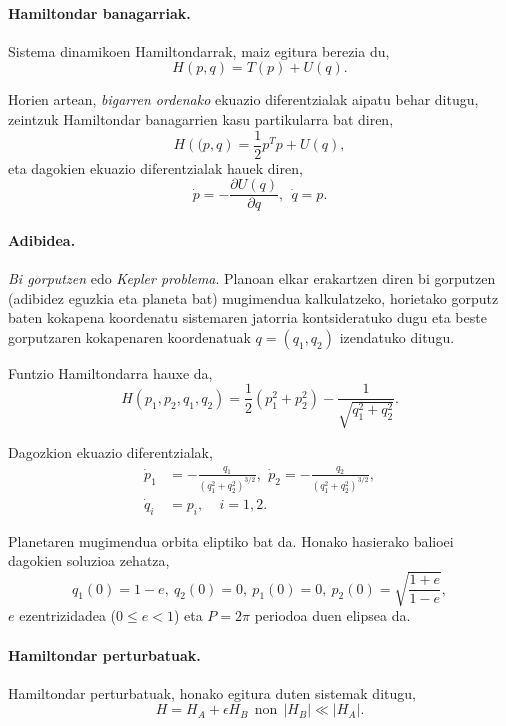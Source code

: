 \paragraph*{Hamiltondar banagarriak.} Sistema dinamikoen Hamiltondarrak, maiz egitura berezia du,
\begin{equation*}
H({p},{q})=T(p)+U({q}).
\end{equation*} 

Horien artean, \emph{bigarren ordenako} ekuazio diferentzialak aipatu behar ditugu, zeintzuk Hamiltondar banagarrien kasu partikularra bat diren,  
\begin{equation*}
H(\mathbf(p,q)=\frac{1}{2}p^Tp +U(q),
\end{equation*}
eta dagokien ekuazio diferentzialak hauek diren,
\begin{equation}
\label{eq:biorden}
\dot{p}=-\frac{\partial U(q)}{\partial q}, \ \ \dot{q}=p. 
\end{equation}

\paragraph*{Adibidea.}
\emph{Bi gorputzen} edo \emph{Kepler problema}. Planoan elkar erakartzen diren bi gorputzen (adibidez eguzkia eta planeta bat) mugimendua kalkulatzeko, horietako gorputz baten kokapena koordenatu sistemaren jatorria kontsideratuko dugu eta beste gorputzaren kokapenaren koordenatuak $q=(q_1,q_2)$ izendatuko ditugu. 

Funtzio Hamiltondarra hauxe da,
\begin{equation*}
H(p_1,p_2,q_1,q_2)=\frac{1}{2}(p_1^2+p_2^2)-\frac{1}{\sqrt{q_1^2+q_2^2}}.
\end{equation*}

Dagozkion ekuazio diferentzialak,
\begin{align*}
\dot{p}_1 &= -\frac{q_1}{(q_1^2+q_2^2)^{3/2}}, \ \, \dot{p}_2= -\frac{q_2}{(q_1^2+q_2^2)^{3/2}}, \\
\dot{q}_i &=p_i, \ \ \ \ \ i=1,2.
\end{align*}

Planetaren mugimendua orbita eliptiko bat da. Honako hasierako balioei dagokien soluzioa zehatza,
\begin{equation*}
q_1(0)=1-e, \ q_2(0)=0, \ p_1(0)=0, \ p_2(0)=\sqrt{ \frac{1+e}{1-e}}, 
\end{equation*}
$e$ ezentrizidadea ($0\le e < 1$)  eta $P=2\pi$ periodoa duen elipsea da. 

\paragraph*{Hamiltondar perturbatuak.} Hamiltondar perturbatuak, honako egitura duten sistemak ditugu,
\begin{equation*}
H=H_A+\epsilon H_B \ \  \text{non} \ \ |H_B|\ll |H_A|.
\end{equation*}

